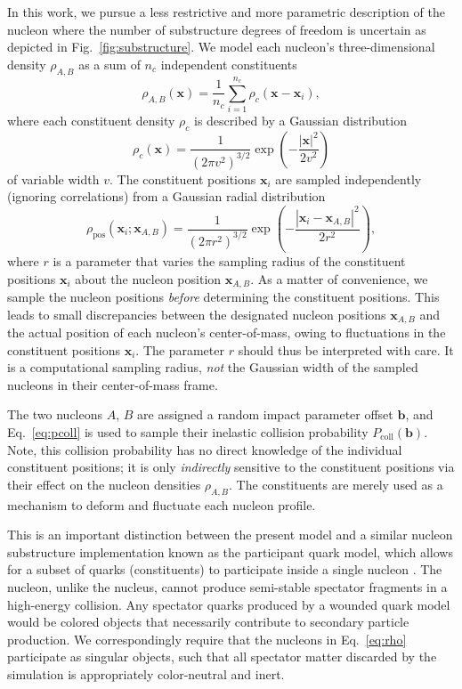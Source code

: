 \documentclass[aps,prc,reprint,amsmath,nofootinbib]{revtex4-1}
\newcommand{\bv}{\mathbf b}
\newcommand{\xv}{\mathbf x}
\begin{document}
In this work, we pursue a less restrictive and more parametric description of the nucleon where the number of substructure degrees of freedom is uncertain as depicted in Fig.~\ref{fig:substructure}.
We model each nucleon's three-dimensional density $\rho_{A,B}$ as a sum of $n_c$ independent constituents
\begin{equation}
  \label{eq:rho}
  \rho_{A, B}(\xv) = \frac{1}{n_c} \sum\limits_{i=1}^{n_c} \rho_c(\xv - \xv_i),
\end{equation}
where each constituent density $\rho_c$ is described by a Gaussian distribution
\begin{equation}
  \rho_c(\xv) = \frac{1}{(2 \pi v^2)^{3/2}} \exp\left(- \frac{|\xv|^2}{2 v^2}\right)
\end{equation}
of variable width $v$.
The constituent positions $\xv_i$ are sampled independently (ignoring correlations) from a Gaussian radial distribution
\begin{equation}
  \label{eq:radial_dist}
  \rho_\text{pos}(\xv_i; \xv_{A,B}) = \frac{1}{(2\pi r^2)^{3/2}} \exp\left(-\frac{|\xv_i - \xv_{A,B}|^2}{2 r^2}\right),
\end{equation}
where $r$ is a parameter that varies the sampling radius of the constituent positions $\xv_i$ about the nucleon position $\xv_{A,B}$.
As a matter of convenience, we sample the nucleon positions \emph{before} determining the constituent positions.
This leads to small discrepancies between the designated nucleon positions $\xv_{A,B}$ and the actual position of each nucleon's center-of-mass, owing to fluctuations in the constituent positions $\xv_i$.
The parameter $r$ should thus be interpreted with care.
It is a computational sampling radius, \emph{not} the Gaussian width of the sampled nucleons in their center-of-mass frame.

The two nucleons $A$, $B$ are assigned a random impact parameter offset $\bv$, and Eq.~\eqref{eq:pcoll} is used to sample their inelastic collision probability $P_\mathrm{coll}(\bv)$.
Note, this collision probability has no direct knowledge of the individual constituent positions; it is only \emph{indirectly} sensitive to the constituent positions via their effect on the nucleon densities $\rho_{A, B}$.
The constituents are merely used as a mechanism to deform and fluctuate each nucleon profile.

This is an important distinction between the present model and a similar nucleon substructure implementation known as the participant quark model, which allows for a subset of quarks (constituents) to participate inside a single nucleon \cite{ANISOVICH1978477, Broniowski:2016pvx}.
The nucleon, unlike the nucleus, cannot produce semi-stable spectator fragments in a high-energy collision.
Any spectator quarks produced by a wounded quark model would be colored objects that necessarily contribute to secondary particle production.
We correspondingly require that the nucleons in Eq.~\eqref{eq:rho} participate as singular objects, such that all spectator matter discarded by the simulation is appropriately color-neutral and inert.
\end{document}
